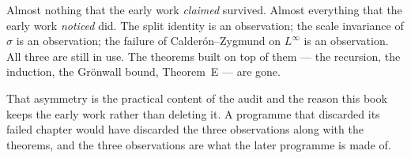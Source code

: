 \begin{obsv}
\label{obs:inheritance-shape}
Almost nothing that the early work \emph{claimed} survived. Almost everything
that the early work \emph{noticed} did. The split identity is an observation;
the scale invariance of \(\sigma\) is an observation; the failure of
Calder\'on--Zygmund on \(L^\infty\) is an observation. All three are still in
use. The theorems built on top of them --- the recursion, the induction, the
Gr\"onwall bound, Theorem~E --- are gone.

That asymmetry is the practical content of the  audit and the reason
this book keeps the early work rather than deleting it. A programme that
discarded its failed chapter would have discarded the three observations along
with the theorems, and the three observations are what the later programme is
made of.
\end{obsv}
